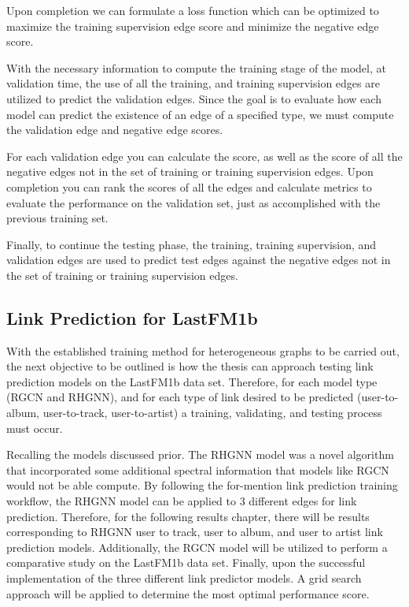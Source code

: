 Upon completion we can formulate a loss function which can be optimized to maximize the training supervision edge score and minimize the negative edge score.



With the necessary information to compute the training stage of the model, at validation time, the use of all the training, and training supervision edges are utilized to predict the validation edges. Since the goal is to evaluate how each model can predict the existence of an edge of a specified type, we must compute the validation edge and negative edge scores. \cite{CS224W}

For each validation edge you can calculate the score, as well as the score of all the negative edges not in the set of training or training supervision edges. Upon completion you can rank the scores of all the edges and calculate metrics to evaluate the performance on the validation set, just as accomplished with the previous training set. 

Finally, to continue the testing phase, the training, training supervision, and validation edges are used to predict test edges against the negative edges not in the set of training or training supervision edges.



\subsection{Link Prediction for LastFM1b}

With the established training method for heterogeneous graphs to be carried out, the next objective to be outlined is how the thesis can approach testing link prediction models on the LastFM1b data set. Therefore, for each model type (RGCN and RHGNN), and for each type of link desired to be predicted (user-to-album, user-to-track, user-to-artist) a training, validating, and testing process must occur. 

Recalling the models discussed prior. The RHGNN model was a novel algorithm that incorporated some additional spectral information that models like RGCN would not be able compute. By following the for-mention link prediction training workflow, the RHGNN model can be applied to 3 different edges for link prediction. Therefore, for the following results chapter, there will be results corresponding to RHGNN user to track, user to album, and user to artist link prediction models. Additionally, the RGCN model will be utilized to perform a comparative study on the LastFM1b data set. Finally, upon the successful implementation of the three different link predictor models. A grid search approach will be applied to determine the most optimal performance score.
